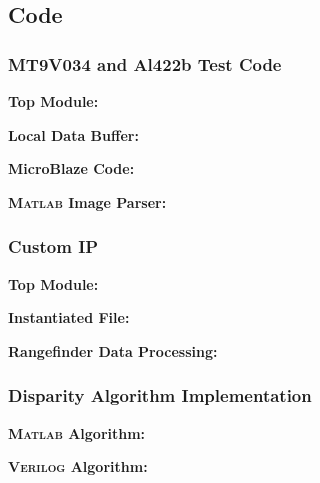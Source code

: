 \subsection{Code}

\subsubsection{MT9V034 and Al422b Test Code} \label{mt9v034TestCode}
\textbf{Top Module:}
\singlespacing

\doublespacing
\par
\textbf{Local Data Buffer:}
\singlespacing

\doublespacing
\par
\textbf{MicroBlaze Code:}
\label{camTestC}
\singlespacing

\doublespacing
\par
\textbf{\textsc{Matlab} Image Parser:}
\label{camTestMatlab}
\singlespacing

\doublespacing

\subsubsection{Custom IP} 
\textbf{Top Module:} \label{customIPtop}
\singlespacing

\doublespacing

\par
\textbf{Instantiated File:} \label{customIPaxi}
\singlespacing

\doublespacing

\par
\textbf{Rangefinder Data Processing:} \label{rangefinderDP}
\singlespacing

\doublespacing

\subsubsection{Disparity Algorithm Implementation} \label{disparityTestMatlab}
\textbf{\textsc{Matlab} Algorithm:}
\singlespacing

\doublespacing

\par
\textbf{\textsc{Verilog} Algorithm:}
\singlespacing

\doublespacing

